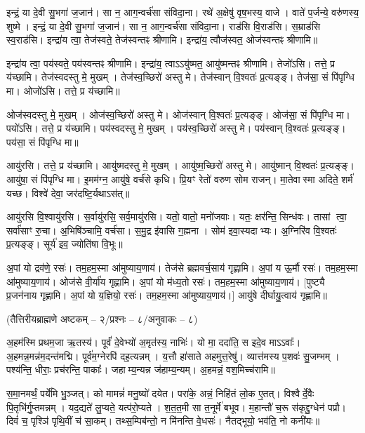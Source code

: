 इन्द्रं॒ या दे॒वी सु॒भगा॑ ज॒जान॑।
सा न॒ आग॒न्वर्च॑सा संविदा॒ना।
रथे॑ अ॒क्षेषु॑ वृष॒भस्य॒ वाजे।
वाते॑ प॒र्जन्ये॒ वरु॑णस्य॒ शुष्मे।
इन्द्रं॒ या दे॒वी सु॒भगा॑ ज॒जान॑।
सा न॒ आग॒न्वर्च॑सा संविदा॒ना।
राड॑सि वि॒राड॑सि।
स॒म्राड॑सि स्व॒राड॑सि।
इन्द्रा॑य त्वा॒ तेज॑स्वते॒ तेज॑स्वन्तꣴ श्रीणामि।
इन्द्रा॑य॒ त्वौज॑स्वत॒ ओज॑स्वन्तꣴ श्रीणामि॥

इन्द्रा॑य त्वा॒ पय॑स्वते॒ पय॑स्वन्तꣴ श्रीणामि।
इन्द्रा॑य॒ त्वाऽऽयु॑ष्मत॒ आयु॑ष्मन्तꣴ श्रीणामि।
तेजो॑ऽसि।
तत्ते॒ प्र य॑च्छामि।
तेज॑स्वदस्तु मे॒ मुखम्।
तेज॑स्व॒च्छिरो॑ अस्तु मे।
तेज॑स्वान् वि॒श्वतः॑ प्र॒त्यङ्ङ्।
तेज॑सा॒ सं पि॑पृग्धि मा।
ओजो॑ऽसि।
तत्ते॒ प्र य॑च्छामि॥

ओज॑स्वदस्तु मे॒ मुखम्।
ओज॑स्व॒च्छिरो॑ अस्तु मे।
ओज॑स्वान् वि॒श्वतः॑ प्र॒त्यङ्ङ्।
ओज॑सा॒ सं पि॑पृग्धि मा।
पयो॑ऽसि।
तत्ते॒ प्र य॑च्छामि।
पय॑स्वदस्तु मे॒ मुखम्।
पय॑स्व॒च्छिरो॑ अस्तु मे।
पय॑स्वान् वि॒श्वतः॑ प्र॒त्यङ्ङ्।
पय॑सा॒ सं पि॑पृग्धि मा॥

आयु॑रसि।
तत्ते॒ प्र य॑च्छामि।
आयु॑ष्मदस्तु मे॒ मुखम्।
आयु॑ष्म॒च्छिरो॑ अस्तु मे।
आयु॑ष्मान् वि॒श्वतः॑ प्र॒त्यङ्ङ्।
आयु॑षा॒ सं पि॑पृग्धि मा।
इ॒मम॑ग्न॒ आयु॑षे॒ वर्च॑से कृधि।
प्रि॒यꣳ रेतो॑ वरुण सोम राजन्।
मा॒तेवास्मा अदिते॒ शर्म॑ यच्छ।
विश्वे॑ देवा॒ जर॑दष्टि॒र्यथाऽस॑त्॥

आयु॑रसि वि॒श्वायु॑रसि।
स॒र्वायु॑रसि॒ सर्व॒मायु॑रसि।
यतो॒ वातो॒ मनो॑जवाः।
यतः॒ क्षर॑न्ति॒ सिन्ध॑वः।
तासां त्वा॒ सर्वा॑साꣳ रु॒चा।
अ॒भिषि॑ञ्चामि॒ वर्च॑सा।
स॒मु॒द्र इ॑वासि ग॒ह्मना।
सोम॑ इवा॒स्यदाभ्यः।
अ॒ग्निरि॑व वि॒श्वतः॑ प्र॒त्यङ्ङ्।
सूर्य॑ इव॒ ज्योति॑षा वि॒भूः॥


अ॒पां यो द्रव॑णे॒ रसः॑।
तम॒हम॒स्मा आ॑मुष्याय॒णाय॑।
तेज॑से ब्रह्मवर्च॒साय॑ गृह्णामि।
अ॒पां य ऊ॒र्मौ रसः॑।
तम॒हम॒स्मा आ॑मुष्याय॒णाय॑।
ओज॑से वी॒र्या॑य गृह्णामि।
अ॒पां यो म॑ध्य॒तो रसः॑।
तम॒हम॒स्मा आ॑मुष्याय॒णाय॑।
[पुष्ट्यै प्र॒जन॑नाय गृह्णामि।
अ॒पां यो य॒ज्ञियो॒ रसः॑।
तम॒हम॒स्मा आ॑मुष्याय॒णाय॑।]
आयु॑षे दीर्घायु॒त्वाय॑ गृह्णामि॥

\centerline{\scriptsize (तैत्तिरीयब्राह्मणे अष्टकम् – २/प्रश्नः – ८/अनुवाकः – ८)}
अ॒हम॑स्मि प्रथम॒जा ऋ॒तस्य॑।
पूर्वं॑ दे॒वेभ्यो॑ अ॒मृत॑स्य॒ नाभिः॑।
यो मा॒ ददा॑ति॒ स इदे॒व माऽऽवाः᳚।
अ॒हमन्न॒मन्न॑म॒दन्त॑मद्मि।
पूर्व॑म॒ग्नेरपि॑ दह॒त्यन्नम्।
य॒त्तौ हा॑साते अहमुत्त॒रेषु॑।
व्यात्त॑मस्य प॒शवः॑ सु॒जम्भम्।
पश्य॑न्ति॒ धीराः॒ प्रच॑रन्ति॒ पाकाः᳚।
जहाम्य॒न्यन्न ज॑हाम्य॒न्यम्।
अ॒हमन्नं॒ वश॒मिच्च॑रामि॥

स॒मा॒नमर्थं॒ पर्ये॑मि भु॒ञ्जत्।
को मामन्नं॑ मनु॒ष्यो॑ दयेत।
परा॑के॒ अन्नं॒ निहि॑तं लो॒क ए॒तत्।
विश्वैर्दे॒वैः पि॒तृभि॑र्गु॒प्तमन्नम्।
यद॒द्यते॑ लु॒प्यते॒ यत्प॑रो॒प्यते।
श॒त॒त॒मी सा त॒नूर्मे॑ बभूव।
म॒हान्तौ॑ च॒रू स॑कृद्दु॒ग्धेन॑ पप्रौ।
दिवं॑ च॒ पृश्ञि॑ पृथि॒वीं च॑ सा॒कम्।
तथ्स॒म्पिब॑न्तो॒ न मि॑नन्ति वे॒धसः॑।
नैतद्भूयो॒ भव॑ति॒ नो कनी॑यः॥

